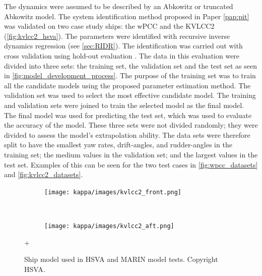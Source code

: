 The dynamics were assumed to be described by an Abkowitz or truncated Abkowitz model. 
The system identification method proposed in Paper \ref{pap:pit} was validated on two case study ships: the wPCC and the KVLCC2 (\autoref{fig:kvlcc2_hsva}). The parameters were identified with recursive inverse dynamics regression (see \autoref{sec:RIDR}).
The identification was carried out with cross validation using hold-out evaluation \cite{sammutHoldoutEvaluation2017}.
The data in this evaluation were divided into three sets: the training set, the validation set and the test set as seen in \autoref{fig:model_development_process}.
The purpose of the training set was to train all the candidate models using the proposed parameter estimation method. The validation set was used to select the most effective candidate model. The training and validation sets were joined to train the selected model as the final model. The final model was used for predicting the test set, which was used to evaluate the accuracy of the model. These three sets were not divided randomly;  they were divided to assess the model’s extrapolation ability. The data sets were therefore split to have the smallest yaw rates, drift-angles, and rudder-angles in the training set; the medium values in the validation set; and the largest values in the test set.
Examples of this can be seen for the two test cases in \autoref{fig:wpcc_datasets} and \autoref{fig:kvlcc2_datasets}.
\begin{figure}[h!]
    \centering
    \begin{subfigure}[b]{0.45\textwidth}
    \centering
    \texttt{[image: kappa/images/kvlcc2\_front.png]}
    \end{subfigure}
    ~
     \begin{subfigure}[b]{0.45\textwidth}
     \centering
     \texttt{[image: kappa/images/kvlcc2\_aft.png]}
     \end{subfigure}
+    \caption{Ship model used in HSVA and MARIN model tests. Copyright HSVA.}
    \label{fig:kvlcc2_hsva}
\end{figure}
